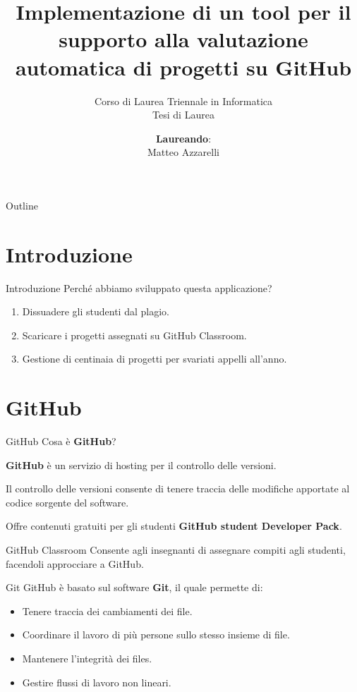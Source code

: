 \documentclass{beamer}
\title{Implementazione di un tool per il supporto alla valutazione automatica di progetti su GitHub}
\subtitle{\vspace{-0cm}Corso di Laurea Triennale in Informatica\\{\large Tesi di Laurea}}
\author{\vspace{-0.5cm}\textbf{Laureando}:\\Matteo Azzarelli}
\date{\vspace{2.5cm}\color{black}{\footnotesize{ANNO ACCADEMICO 2017/2018}}}
\begin{document}
	\maketitle

	\begin{frame}{Outline}
		\tableofcontents
	\end{frame}

	\section{Introduzione}
	
	\begin{frame}{Introduzione}
		Perché abbiamo sviluppato questa applicazione?
		\pause
		\begin{enumerate}[<+->]
			\item Dissuadere gli studenti dal plagio.
			\item Scaricare i progetti assegnati su GitHub Classroom.
			\item Gestione di centinaia di progetti per svariati appelli all'anno.
		\end{enumerate}
	\end{frame}

	\section{GitHub}
	
	\begin{frame}{GitHub}
		Cosa è \textbf{GitHub}?
		
		\vspace{0.5cm}
		\textbf{GitHub} è un servizio di hosting per il controllo delle versioni. 
		
		\vspace{0.5cm}
		Il controllo delle versioni consente di tenere traccia delle modifiche apportate al codice sorgente del software.
		\pause
		
		\begin{alertblock}{}
			Offre contenuti gratuiti per gli studenti \textbf{GitHub student Developer Pack}.
		\end{alertblock}
		\begin{alertblock}{GitHub Classroom}
			Consente agli insegnanti di assegnare compiti agli studenti, facendoli approcciare a GitHub.
		\end{alertblock}
	\end{frame}
	

	\begin{frame}{Git}
		GitHub è basato sul software \textbf{Git}, il quale permette di:
		\begin{itemize}[<+->]
			\item Tenere traccia dei cambiamenti dei file.
			\item Coordinare il lavoro di più persone sullo stesso insieme di file.
			\item Mantenere l'integrità dei files.
			\item Gestire flussi di lavoro non lineari.
		\end{itemize}
	\end{frame}
	
\end{document}
